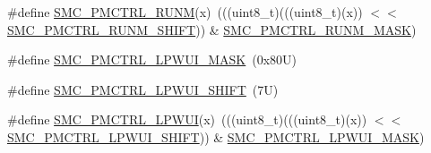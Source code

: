 \begin{DoxyCompactItemize}
\item 
\#define \mbox{\hyperlink{group___s_m_c___register___masks_gaa375b91daca0dd7f4b1452da903b5bdc}{S\+M\+C\+\_\+\+P\+M\+C\+T\+R\+L\+\_\+\+R\+U\+NM}}(x)~(((uint8\+\_\+t)(((uint8\+\_\+t)(x)) $<$$<$ \mbox{\hyperlink{group___s_m_c___register___masks_ga8f8dc472f4a4b6ad1babae518c44d55e}{S\+M\+C\+\_\+\+P\+M\+C\+T\+R\+L\+\_\+\+R\+U\+N\+M\+\_\+\+S\+H\+I\+FT}})) \& \mbox{\hyperlink{group___s_m_c___register___masks_ga1a456925e291d6d53f4891b25fcaf8eb}{S\+M\+C\+\_\+\+P\+M\+C\+T\+R\+L\+\_\+\+R\+U\+N\+M\+\_\+\+M\+A\+SK}})
\item 
\#define \mbox{\hyperlink{group___s_m_c___register___masks_ga13fe417a536c3dc080bb978a13a6364d}{S\+M\+C\+\_\+\+P\+M\+C\+T\+R\+L\+\_\+\+L\+P\+W\+U\+I\+\_\+\+M\+A\+SK}}~(0x80\+U)
\item 
\#define \mbox{\hyperlink{group___s_m_c___register___masks_ga923f713c8f946601de6acd8088624b20}{S\+M\+C\+\_\+\+P\+M\+C\+T\+R\+L\+\_\+\+L\+P\+W\+U\+I\+\_\+\+S\+H\+I\+FT}}~(7\+U)
\item 
\#define \mbox{\hyperlink{group___s_m_c___register___masks_ga14b0e2f1e0a9dae353f8c8514617137a}{S\+M\+C\+\_\+\+P\+M\+C\+T\+R\+L\+\_\+\+L\+P\+W\+UI}}(x)~(((uint8\+\_\+t)(((uint8\+\_\+t)(x)) $<$$<$ \mbox{\hyperlink{group___s_m_c___register___masks_ga923f713c8f946601de6acd8088624b20}{S\+M\+C\+\_\+\+P\+M\+C\+T\+R\+L\+\_\+\+L\+P\+W\+U\+I\+\_\+\+S\+H\+I\+FT}})) \& \mbox{\hyperlink{group___s_m_c___register___masks_ga13fe417a536c3dc080bb978a13a6364d}{S\+M\+C\+\_\+\+P\+M\+C\+T\+R\+L\+\_\+\+L\+P\+W\+U\+I\+\_\+\+M\+A\+SK}})
\end{DoxyCompactItemize}

